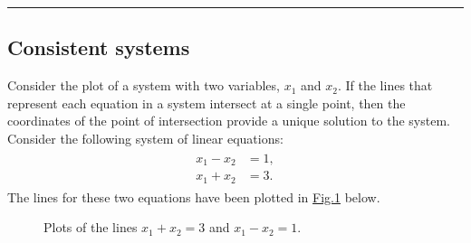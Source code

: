 \documentclass[letterpaper,10pt,english]{jupyterBook}
\begin{document}
\bigskip\hrule\bigskip



\subsection{Consistent systems}
\label{\detokenize{_pages/2.6_Consistent_systems:consistent-systems}}
\ignorespaces 
\sphinxAtStartPar
Consider the plot of a system with two variables, \(x_1\) and \(x_2\). If the lines that represent each equation in a system intersect at a single point, then the coordinates of the point of intersection provide a unique solution to the system. Consider the following system of linear equations:
\begin{equation*}
\begin{split} \begin{align*}
    x_1 - x_2 &= 1, \\
    x_1 + x_2 &= 3.
\end{align*} \end{split}
\end{equation*}
\sphinxAtStartPar
The lines for these two equations have been plotted in \hyperref[\detokenize{_pages/2.6_Consistent_systems:consistent-system-plot}]{Fig.\@ \ref{\detokenize{_pages/2.6_Consistent_systems:consistent-system-plot}}} below.

\begin{figure}[htbp]
\centering
\capstart

\noindent{}
\caption{Plots of the lines \(x_1 + x_2 = 3\) and \(x_1 - x_2 = 1\).}\label{\detokenize{_pages/2.6_Consistent_systems:consistent-system-plot}}\end{figure}
\end{document}
